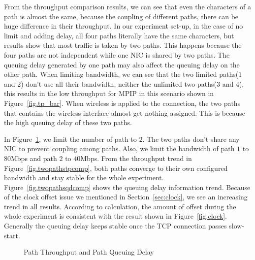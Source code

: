 From the throughput comparison results, we can see that even the characters of a path is almost the same, because the coupling of different paths, there can be huge difference in their throughput. In our experiment set-up, in the case of no limit and adding delay, all four paths literally have the same characters, but results show that most traffic is taken by two paths. This happens because the four paths are not independent while one NIC is shared by two paths. The queuing delay generated by one path may also affect the queuing delay on the other path. When limiting bandwidth, we can see that the two limited paths($1$ and $2$) don't use all their bandwidth, neither the unlimited two paths($3$ and $4$), this results in the low throughput for MPIP in this scenario shown in Figure~\ref{fig.tp_bar}. When wireless is applied to the connection, the two paths that contains the wireless interface almost get nothing assigned. This is because the high queuing delay of these two paths.

In Figure~\ref{fig.mpip_path}, we limit the number of path to $2$. The two paths don't share any NIC to prevent coupling among paths. Also, we limit the bandwidth of path $1$ to $80$Mbps and path $2$ to $40$Mbps. From the throughput trend in Figure~\ref{fig.twopathstpcomp}, both paths converge to their own configured bandwidth and stay stable for the whole experiment. Figure~\ref{fig.twopathsqdcomp} shows the queuing delay information trend. Because of the clock offset issue we mentioned in Section~\ref{sec:clock}, we see an increasing trend in all results. According to calculation, the amount of offset during the whole experiment is consistent with the result shown in Figure~\ref{fig.clock}. Generally the queuing delay keeps stable once the TCP connection passes slow-start.


\begin{figure}[htb]
\caption{Path Throughput and Path Queuing Delay}
\label{fig.mpip_path}
\end{figure}


